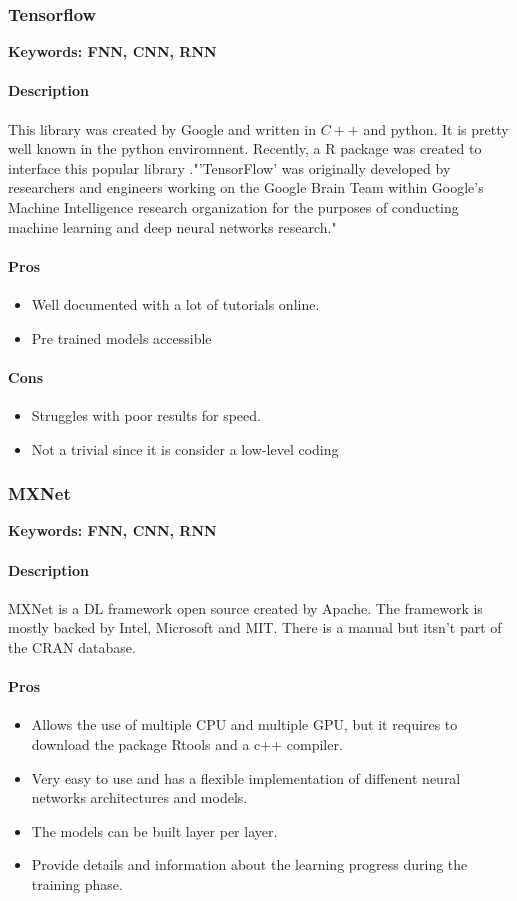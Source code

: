 \documentclass[6pt,letter]{article}\usepackage[]{graphicx}\usepackage[]{color}
\begin{document}
\subsubsection{Tensorflow}
\textbf{Keywords: FNN, CNN, RNN}
\paragraph{Description}
This library was created by Google and written in $C++$ and python. It is pretty well known in the python enviromnent. Recently, a R package was created to interface this popular library \cite{tensorflow2019}."'TensorFlow' was originally developed by researchers and engineers working on the Google Brain Team within Google's Machine Intelligence research organization for the purposes of conducting machine learning and deep neural networks research."
\paragraph{Pros}
\begin{itemize}
\item Well documented with a lot of tutorials online.
\item Pre trained models accessible
\end{itemize}

\paragraph{Cons}
\begin{itemize}
\item Struggles with poor results for speed.
\item Not a trivial since it is consider a low-level coding
\end{itemize}

\subsubsection{MXNet}
\textbf{Keywords: FNN, CNN, RNN}
\paragraph{Description}
MXNet is a DL framework open source created by Apache. The framework is mostly backed by Intel, Microsoft and MIT. There is a manual\cite{mxnet2020} but itsn't part of the CRAN database.
\paragraph{Pros}
\begin{itemize}
\item Allows the use of multiple CPU and multiple GPU, but it requires to download the package Rtools and a c++ compiler.
\item Very easy to use and has a flexible implementation of diffenent neural networks architectures and models.
\item The models can be built layer per layer.
\item Provide details and information about the learning progress during the training phase.
\end{itemize}
\end{document}
